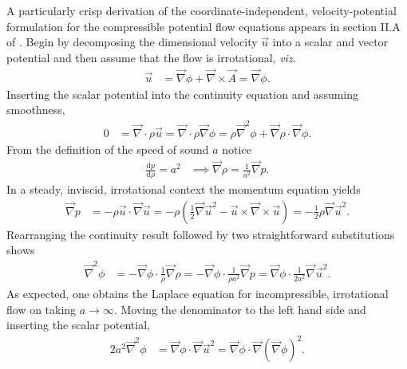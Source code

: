 \documentclass[letterpaper,11pt,nointlimits,reqno]{amsart}
\begin{document}
A particularly crisp derivation of the coordinate-independent, velocity-potential
formulation for the compressible potential flow equations appears in section
II.A of \citet{Saad2011Coordinate}.  Begin by decomposing the dimensional
velocity $\vec{u}$ into a scalar and vector potential and then assume
that the flow is irrotational, \emph{viz.}
\begin{align}
  \vec{u} &= \vec{\nabla}\phi + \vec{\nabla}\times\vec{A} =  \vec{\nabla}\phi
.
\end{align}
Inserting the scalar potential into the continuity equation and assuming
smoothness,
\begin{align}
  0 &= \vec{\nabla}\cdot\rho\vec{u}
     = \vec{\nabla}\cdot\rho\vec{\nabla}\phi
     = \rho\vec{\nabla}^2\phi
     + \vec{\nabla}\rho\cdot\vec{\nabla}\phi
.
\end{align}
From the definition of the speed of sound $a$ notice
\begin{align}
    \frac{\mathrm{d}p}{\mathrm{d}\rho} = a^2
    &\implies
    \vec{\nabla}\rho = \frac{1}{a^2} \vec{\nabla} p
.
\end{align}
In a steady, inviscid, irrotational context the momentum equation yields
\begin{align}
    \vec{\nabla}p
    &= -\rho \vec{u}\cdot\vec{\nabla}\vec{u}
     = -\rho \left(   \frac{1}{2}\vec{\nabla}\vec{u}^2
                    - \vec{u}\times\vec{\nabla}\times\vec{u}
        \right)
     = - \frac{1}{2} \rho \vec{\nabla}\vec{u}^2
.
\end{align}
Rearranging the continuity result followed by two straightforward substitutions shows
\begin{align}
    \vec{\nabla}^2\phi
    &= -\vec{\nabla}\phi\cdot\frac{1}{\rho}\vec{\nabla}\rho
     = -\vec{\nabla}\phi\cdot\frac{1}{\rho{}a^2}\vec{\nabla}p
     =  \vec{\nabla}\phi\cdot\frac{1}{2a^2} \vec{\nabla}\vec{u}^2
.
\end{align}
As expected, one obtains the Laplace equation for incompressible, irrotational
flow on taking $a \to \infty$.  Moving the denominator to the left
hand side and inserting the scalar potential,
\begin{align}
    2 a^2 \vec{\nabla}^2\phi
    &= \vec{\nabla}\phi\cdot \vec{\nabla}\vec{u}^2
     = \vec{\nabla}\phi\cdot \vec{\nabla}\left(\vec{\nabla}\phi\right)^2
.
\end{align}
\end{document}
